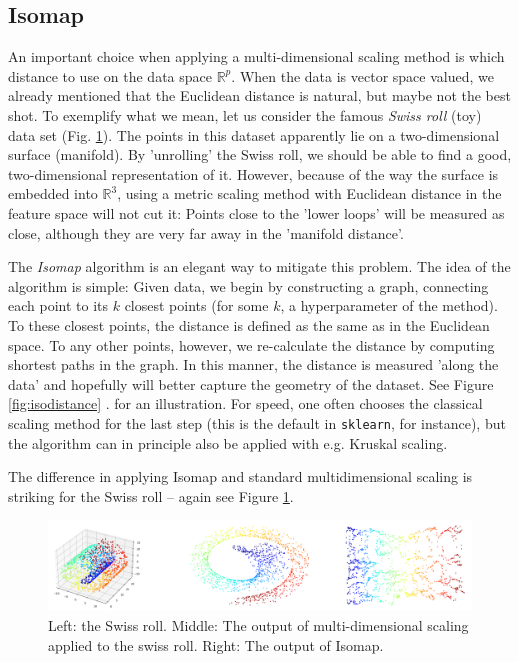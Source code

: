 \documentclass{article}
\newcommand{\R}{\mathbb{R}}
\begin{document}
\subsection{Isomap} 
An important choice when applying a multi-dimensional scaling method is which distance to use on the data space $\R^p$. When the data is vector space valued, we already mentioned that the Euclidean distance is natural, but maybe not the best shot. To exemplify what we mean, let us consider the famous \emph{Swiss roll} (toy) data set (Fig. \ref{fig:swiss}). The points in this dataset apparently lie on a two-dimensional surface (manifold). By 'unrolling' the Swiss roll, we should be able to find a good, two-dimensional representation of it. However, because of the way the surface is embedded into $\R^3$, using a metric scaling method with Euclidean distance in the feature space will not cut it: Points close to the 'lower loops' will be measured as close, although they are very far away in the 'manifold distance'.

The \emph{Isomap} algorithm is an elegant way to mitigate this problem. The idea of the algorithm is simple: Given data, we begin by constructing a graph, connecting each point to its $k$ closest points (for some $k$, a hyperparameter of the method). To these closest points, the distance is defined as the same as in the Euclidean space. To any other points, however, we re-calculate the distance by computing shortest paths in the graph. In this manner, the distance is measured 'along the data' and hopefully will better capture the geometry of the dataset. See Figure \ref{fig:isodistance} . for an illustration. For speed, one often chooses the classical scaling method for the last step (this is the default in \texttt{sklearn}, for instance), but the algorithm can in principle also be applied with e.g. Kruskal scaling. 

The difference in applying Isomap and standard multidimensional scaling is striking for the Swiss roll -- again see Figure \ref{fig:swiss}.






\begin{figure}
    \centering
    \includegraphics[width=0.85\linewidth]{graphics/swiss_roll.png}
    \caption{Left: the Swiss roll. Middle: The output of multi-dimensional scaling applied to the swiss roll. Right: The output of Isomap.}
    \label{fig:swiss}
\end{figure}
\end{document}
